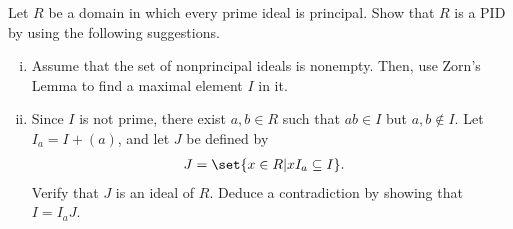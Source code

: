 \documentclass[10pt]{mypackage}
\begin{document}
\begin{problem}[Problem 4]
  Let $R$ be a domain in which every prime ideal is principal. Show that $R$ is a PID by using the following suggestions.
  \begin{enumerate}[(i)]
    \item Assume that the set of nonprincipal ideals is nonempty. Then, use Zorn's Lemma to find a maximal element $I$ in it.
    \item Since $I$ is not prime, there exist $a,b\in R$ such that $ab\in I$ but $a,b\notin I$. Let $I_a = I + \left( a \right)$, and let $J$ be defined by
      \begin{align*}
        J &= \set{x\in R | xI_{a}\subseteq I}.
      \end{align*}
      Verify that $J$ is an ideal of $R$. Deduce a contradiction by showing that $I = I_aJ$.
  \end{enumerate}
\end{problem}
\end{document}
